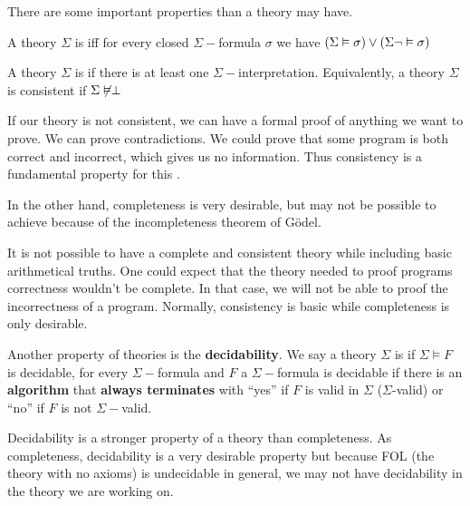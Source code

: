 There are some important properties than a theory may have. 

A theory $\Sigma$ is  \gls{iff} for every closed $\Sigma-$formula $\sigma$ we have $(\Sigma\vDash \sigma) \vee (\Sigma\neg\vDash \sigma) $

A theory $\Sigma$ is  if there is at least one $\Sigma-$interpretation.	Equivalently, a theory $\Sigma$ is consistent if $\Sigma \not\vDash \perp$

If our theory is not consistent, we can have a formal proof of anything we want to prove. 
%
We can prove contradictions. 
%
We could prove that some program is both correct and incorrect, which gives us no information. 
%
Thus consistency is a fundamental property for this \thisworkm.

In the other hand, completeness is very desirable, but may not be possible to achieve because of the incompleteness theorem of Gödel.


It is not possible to have a complete and consistent theory while including basic arithmetical truths. 
%
One could expect that the theory needed to proof programs correctness wouldn't be complete. 
%
In that case, we will not be able to proof the incorrectness of a program.
%
Normally, consistency is basic while completeness is only desirable.

Another property of theories is the \textbf{decidability}. We say a theory $\Sigma$ is  if $\Sigma \vDash F$ is decidable, for every $\Sigma-$formula 
and 
$F$ a $\Sigma-$formula is decidable if there is an \textbf{algorithm} that \textbf{always terminates} with ``yes'' if $F$ is valid in $\Sigma$ ($\Sigma$-valid) or ``no'' if $F$ is not $\Sigma-$valid.


Decidability is a stronger property of a theory than completeness. 
%
As completeness, decidability is a very desirable property but because \gls{FOL} (the theory with no axioms) is undecidable in general, we may not have decidability in the theory we are working on.



